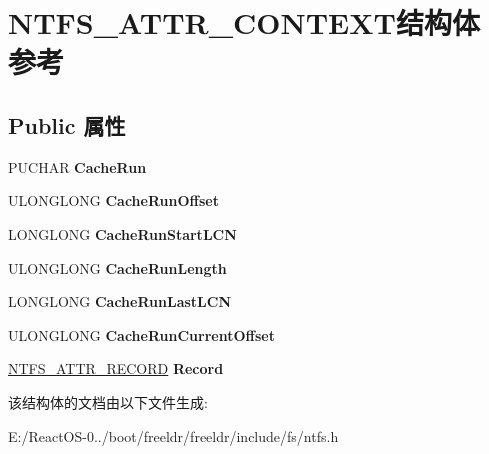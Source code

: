 \hypertarget{struct_n_t_f_s___a_t_t_r___c_o_n_t_e_x_t}{}\section{N\+T\+F\+S\+\_\+\+A\+T\+T\+R\+\_\+\+C\+O\+N\+T\+E\+X\+T结构体 参考}
\label{struct_n_t_f_s___a_t_t_r___c_o_n_t_e_x_t}
\subsection*{Public 属性}
\begin{DoxyCompactItemize}
\item 
\mbox{\label{struct_n_t_f_s___a_t_t_r___c_o_n_t_e_x_t_a606e30f57e19259c66de648572b735e7}} 
P\+U\+C\+H\+AR {\bfseries Cache\+Run}
\item 
\mbox{\label{struct_n_t_f_s___a_t_t_r___c_o_n_t_e_x_t_a9cc2f88eb972d1c63e7634d6c0fb4304}} 
U\+L\+O\+N\+G\+L\+O\+NG {\bfseries Cache\+Run\+Offset}
\item 
\mbox{\label{struct_n_t_f_s___a_t_t_r___c_o_n_t_e_x_t_a24e311c3b67da2abb51645ec1894deb0}} 
L\+O\+N\+G\+L\+O\+NG {\bfseries Cache\+Run\+Start\+L\+CN}
\item 
\mbox{\label{struct_n_t_f_s___a_t_t_r___c_o_n_t_e_x_t_a1f7aa4faa881ee8c4ff7da592ce904df}} 
U\+L\+O\+N\+G\+L\+O\+NG {\bfseries Cache\+Run\+Length}
\item 
\mbox{\label{struct_n_t_f_s___a_t_t_r___c_o_n_t_e_x_t_abe99e441a557eb9127d2508f1a3c6a67}} 
L\+O\+N\+G\+L\+O\+NG {\bfseries Cache\+Run\+Last\+L\+CN}
\item 
\mbox{\label{struct_n_t_f_s___a_t_t_r___c_o_n_t_e_x_t_a50abdd44f57e001f3ca8a33d116ca33c}} 
U\+L\+O\+N\+G\+L\+O\+NG {\bfseries Cache\+Run\+Current\+Offset}
\item 
\mbox{\label{struct_n_t_f_s___a_t_t_r___c_o_n_t_e_x_t_afb2cbb3441ce464a348fcc96daf265b5}} 
\hyperlink{struct_n_t_f_s___a_t_t_r___r_e_c_o_r_d}{N\+T\+F\+S\+\_\+\+A\+T\+T\+R\+\_\+\+R\+E\+C\+O\+RD} {\bfseries Record}
\end{DoxyCompactItemize}


该结构体的文档由以下文件生成\+:\begin{DoxyCompactItemize}
\item 
E\+:/\+React\+O\+S-\/0../boot/freeldr/freeldr/include/fs/ntfs.\+h\end{DoxyCompactItemize}
